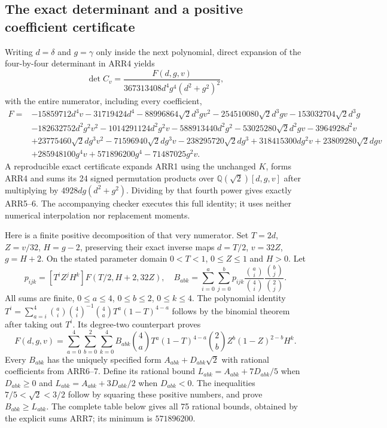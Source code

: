 \subsection{The exact determinant and a positive coefficient certificate}
Writing $d=\delta$ and $g=\gamma$ only inside the next polynomial,
direct expansion of the four-by-four determinant in ARR4 yields
\[
 \det C_v=\frac{F(d,g,v)}{367313408d^4g^4(d^2+g^2)^2},
 \tag{ARR5}
\]
with the entire numerator, including every coefficient,
\[
\begin{aligned}
F={}&-15859712d^4v-31719424d^4
 -88996864\sqrt2d^3gv^2-254510080\sqrt2d^3gv
 -153032704\sqrt2d^3g\\
&-182632752d^2g^2v^2-1014291124d^2g^2v
 -588913440d^2g^2-53025280\sqrt2d^2gv-3964928d^2v\\
&+23775460\sqrt2dg^3v^2-71596940\sqrt2dg^3v
 -238295720\sqrt2dg^3+318415300dg^2v
 +23809280\sqrt2dgv\\
&+285948100g^4v+571896200g^4-71487025g^2v.
\end{aligned}\tag{ARR6}
\]
A reproducible exact certificate expands ARR1 using the unchanged
$K$, forms ARR4 and sums its 24 signed permutation products over
$\mathbb Q(\sqrt2)[d,g,v]$ after multiplying by
$4928dg(d^2+g^2)$. Dividing by that fourth power gives exactly
ARR5--6. The accompanying checker executes this full identity;
it uses neither numerical interpolation nor replacement moments.

Here is a finite positive decomposition of that very numerator.
Set $T=2d$, $Z=v/32$, $H=g-2$, preserving their exact inverse
maps $d=T/2$, $v=32Z$, $g=H+2$. On the stated parameter domain
$0<T<1$, $0\le Z\le1$ and $H>0$. Let
\[
 p_{ijk}=[T^iZ^jH^k]F(T/2,H+2,32Z),\quad
 B_{abk}=\sum_{i=0}^a\sum_{j=0}^b
  p_{ijk}\frac{\binom ai}{\binom4i}
          \frac{\binom bj}{\binom2j}.
 \tag{ARR7}
\]
All sums are finite, $0\le a\le4$, $0\le b\le2$, $0\le k\le4$.
The polynomial identity
$T^i=\sum_{a=i}^4\binom ai\binom4i^{-1}
\binom4aT^a(1-T)^{4-a}$ follows by the binomial theorem after
taking out $T^i$. Its degree-two counterpart proves
\[
 F(d,g,v)=\sum_{a=0}^4\sum_{b=0}^2\sum_{k=0}^4
 B_{abk}\binom4aT^a(1-T)^{4-a}
              \binom2bZ^b(1-Z)^{2-b}H^k.
 \tag{ARR8}
\]
Every $B_{abk}$ has the uniquely specified form $A_{abk}+D_{abk}\sqrt2$
with rational coefficients from ARR6--7. Define its rational bound
$L_{abk}=A_{abk}+7D_{abk}/5$ when $D_{abk}\ge0$ and
$L_{abk}=A_{abk}+3D_{abk}/2$ when $D_{abk}<0$.
The inequalities $7/5<\sqrt2<3/2$ follow by squaring these
positive numbers, and prove $B_{abk}\ge L_{abk}$.
The complete table below gives all 75 rational bounds, obtained by
the explicit sums ARR7; its minimum is $571896200$.

